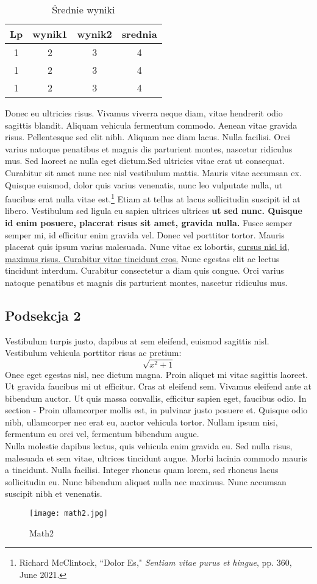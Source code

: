 \documentclass[12pt,a4paper]{article}
\begin{document}
	\begin{table}[H]
		\centering
		\begin{tabular}{||c c c c||} 
			\hline
			Lp & wynik1 & wynik2 & srednia \\ [0.5ex] 
			\hline\hline
			1 & 2 & 3 & 4 \\ 
			\hline
			1 & 2 & 3 & 4 \\
			\hline
			1 & 2 & 3 & 4 \\ [1ex] 
			\hline
		\end{tabular}
	\caption{Średnie wyniki}
	\label{table: SrednieWyniki}
	\end{table}
	Donec eu ultricies risus. Vivamus viverra neque diam, vitae hendrerit odio sagittis blandit. Aliquam vehicula fermentum commodo. Aenean vitae gravida risus. Pellentesque sed elit nibh. Aliquam nec diam lacus. Nulla facilisi. Orci varius natoque penatibus et magnis dis parturient montes, nascetur ridiculus mus. Sed laoreet ac nulla eget dictum.Sed ultricies vitae erat ut consequat. Curabitur sit amet nunc nec nisl vestibulum mattis. Mauris vitae accumsan ex. Quisque euismod, dolor quis varius venenatis, nunc leo vulputate nulla, ut faucibus erat nulla vitae est.\footnote{Richard McClintock, ``Dolor Es," \emph{Sentiam vitae purus et hingue}, pp. 360, June 2021.} Etiam at tellus at lacus sollicitudin suscipit id at libero. Vestibulum sed ligula eu sapien ultrices ultrices \textbf{ut sed nunc. Quisque id enim posuere, placerat risus sit amet, gravida nulla.} Fusce semper semper mi, id efficitur enim gravida vel. Donec vel porttitor tortor. Mauris placerat quis ipsum varius malesuada. Nunc vitae ex lobortis, \underline{cursus nisl id, maximus risus. Curabitur vitae tincidunt eros.} Nunc egestas elit ac lectus tincidunt interdum. Curabitur consectetur a diam quis congue. Orci varius natoque penatibus et magnis dis parturient montes, nascetur ridiculus mus. 

	
	\subsection{Podsekcja 2}
	Vestibulum turpis justo, dapibus at sem eleifend, euismod sagittis nisl. Vestibulum vehicula porttitor risus ac pretium:
	\[\sqrt{x^2+1}\] 
	Onec eget egestas nisl, nec dictum magna. Proin aliquet mi vitae sagittis laoreet. Ut gravida faucibus mi ut efficitur. Cras at eleifend sem. Vivamus eleifend ante at bibendum auctor. Ut quis massa convallis, efficitur sapien eget, faucibus odio.
	In section  - Proin ullamcorper mollis est, in pulvinar justo posuere et. Quisque odio nibh, ullamcorper nec erat eu, auctor vehicula tortor. Nullam ipsum nisi, fermentum eu orci vel, fermentum bibendum augue.
	\\Nulla molestie dapibus lectus, quis vehicula enim gravida eu. Sed nulla risus, malesuada et sem vitae, ultrices tincidunt augue. Morbi lacinia commodo mauris a tincidunt. Nulla facilisi. Integer rhoncus quam lorem, sed rhoncus lacus sollicitudin eu. Nunc bibendum aliquet nulla nec maximus. Nunc accumsan suscipit nibh et venenatis. 
	\begin{figure}[H]
		\centering
		\texttt{[image: math2.jpg]}
		\caption{Math2}
		\label{fig: Math2}
	\end{figure}
\end{document}
